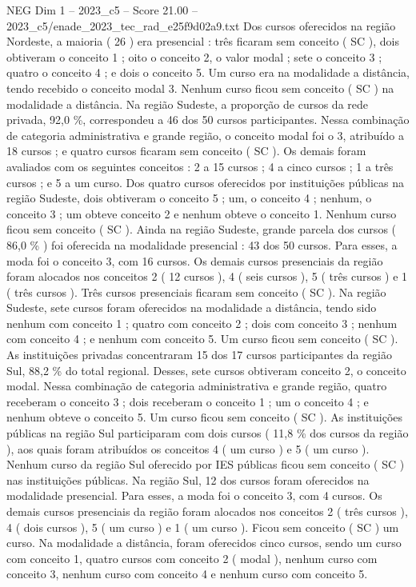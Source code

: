 \begin{textsample}{NEG Dim 1 – 2023\_c5 – Score 21.00 – 2023\_c5/enade\_2023\_tec\_rad\_e25f9d02a9.txt}
Dos cursos oferecidos na região Nordeste, a maioria ( 26 ) era presencial : três ficaram sem conceito ( SC ), dois obtiveram o conceito 1 ; oito o conceito 2, o valor modal ; sete o conceito 3 ; quatro o conceito 4 ; e dois o conceito 5.
Um curso era na modalidade a distância, tendo recebido o conceito modal 3.
Nenhum curso ficou sem conceito ( SC ) na modalidade a distância.
Na região Sudeste, a proporção de cursos da rede privada, 92,0 \%, correspondeu a 46 dos 50 cursos participantes.
Nessa combinação de categoria administrativa e grande região, o conceito modal foi o 3, atribuído a 18 cursos ; e quatro cursos ficaram sem conceito ( SC ).
Os demais foram avaliados com os seguintes conceitos : 2 a 15 cursos ; 4 a cinco cursos ; 1 a três cursos ; e 5 a um curso.
Dos quatro cursos oferecidos por instituições públicas na região Sudeste, dois obtiveram o conceito 5 ; um, o conceito 4 ; nenhum, o conceito 3 ; um obteve conceito 2 e nenhum obteve o conceito 1.
Nenhum curso ficou sem conceito ( SC ).
Ainda na região Sudeste, grande parcela dos cursos ( 86,0 \% ) foi oferecida na modalidade presencial : 43 dos 50 cursos.
Para esses, a moda foi o conceito 3, com 16 cursos.
Os demais cursos presenciais da região foram alocados nos conceitos 2 ( 12 cursos ), 4 ( seis cursos ), 5 ( três cursos ) e 1 ( três cursos ).
Três cursos presenciais ficaram sem conceito ( SC ).
Na região Sudeste, sete cursos foram oferecidos na modalidade a distância, tendo sido nenhum com conceito 1 ; quatro com conceito 2 ; dois com conceito 3 ; nenhum com conceito 4 ; e nenhum com conceito 5.
Um curso ficou sem conceito ( SC ).
As instituições privadas concentraram 15 dos 17 cursos participantes da região Sul, 88,2 \% do total regional.
Desses, sete cursos obtiveram conceito 2, o conceito modal.
Nessa combinação de categoria administrativa e grande região, quatro receberam o conceito 3 ; dois receberam o conceito 1 ; um o conceito 4 ; e nenhum obteve o conceito 5.
Um curso ficou sem conceito ( SC ).
As instituições públicas na região Sul participaram com dois cursos ( 11,8 \% dos cursos da região ), aos quais foram atribuídos os conceitos 4 ( um curso ) e 5 ( um curso ).
Nenhum curso da região Sul oferecido por IES públicas ficou sem conceito ( SC ) nas instituições públicas.
Na região Sul, 12 dos cursos foram oferecidos na modalidade presencial.
Para esses, a moda foi o conceito 3, com 4 cursos.
Os demais cursos presenciais da região foram alocados nos conceitos 2 ( três cursos ), 4 ( dois cursos ), 5 ( um curso ) e 1 ( um curso ).
Ficou sem conceito ( SC ) um curso.
Na modalidade a distância, foram oferecidos cinco cursos, sendo um curso com conceito 1, quatro cursos com conceito 2 ( modal ), nenhum curso com conceito 3, nenhum curso com conceito 4 e nenhum curso com conceito 5.

\end{textsample}
